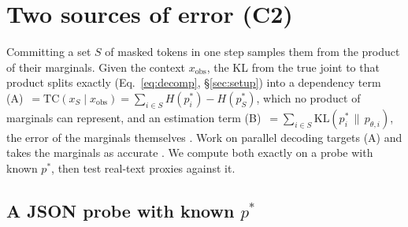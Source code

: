 %
%

\section{Two sources of error (C2)}
\label{sec:c2}

Committing a set $S$ of masked tokens in one step samples them from the product of their
marginals. Given the context $x_{\mathrm{obs}}$, the KL from the true joint to that product
splits exactly (Eq.~\ref{eq:decomp}, \S\ref{sec:setup}) into a dependency term
(A)~$=\mathrm{TC}(x_S \mid x_{\mathrm{obs}}) = \sum_{i\in S} H(p^*_i) - H(p^*_S)$, which no
product of marginals can represent, and an estimation term
(B)~$=\sum_{i\in S}\mathrm{KL}(p^*_i \,\|\, p_{\theta,i})$, the error of the marginals
themselves \citep[cf.][]{benhamu2025entropy}. Work on parallel decoding targets (A) and takes
the marginals as accurate \citep{kim2026dapd,ringel2026demask,azangulov2026punt,kang2026parallelbench}.
We compute both exactly on a probe with known $p^*$, then test real-text proxies against it.

\subsection{A JSON probe with known $p^*$}
\label{sec:c2-probe}

